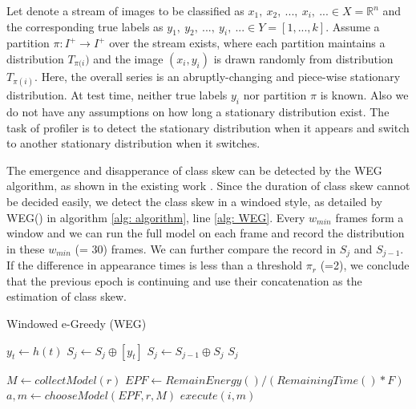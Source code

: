 \documentclass[pageno]{jpaper}
\begin{document}
Let denote a stream of images to be classified as $x_1, \: x_2, \: ...,\: x_i, \: ... \in X = \mathbb{R}^n$ and the corresponding true labels as $y_1, \:y_2, \:...,\:y_i, \:... \in Y = [1, ..., k]$. Assume a partition $\pi: I^+ \rightarrow I^+$ over the stream exists, where each partition maintains a distribution $T_{\pi(i})$ and the image $(x_i, y_i)$ is drawn randomly from distribution $T_{\pi(i)}$. Here, the overall series is an abruptly-changing and piece-wise stationary distribution. At test time, neither true labels $y_i$ nor partition $\pi$ is known. Also we do not have any assumptions on how long a stationary distribution exist. The task of profiler is to detect the stationary distribution when it appears and switch to another stationary distribution when it switches.

The emergence and disapperance of class skew can be detected by the WEG algorithm, as shown in the existing work \cite{shen2016fast}. Since the duration of class skew cannot be decided easily, we detect the class skew in a windoed style, as detailed by WEG() in algorithm \ref{alg: algorithm}, line \ref{alg: WEG}. Every $w_{min}$ frames form a window and we can run the full model on each frame and record the distribution in these $w_{min}$ (= 30) frames. We can further compare the record in $S_j$ and $S_{j-1}$. If the difference in appearance times is less than a threshold $\pi_r$ (=2), we conclude that the previous epoch is continuing and use their concatenation as the estimation of class skew. 



\begin{algorithm} 
 \small
 \caption{Windowed e-Greedy (WEG)}
  \begin{algorithmic}[1]
     \label{alg: WEG}
            \State $y_t \leftarrow h(t)$
            \State $S_j \leftarrow S_j \oplus [y_t]$
        \EndFor
            \State $S_j \leftarrow S_{j-1} \oplus S_j$
        \EndIf
        \State \Return $S_j$
    \EndFunction
  
       \label{alg: scheduler}
        \State $M \leftarrow collectModel(r)$
        \State $EPF \leftarrow RemainEnergy() / (RemainingTime() \ast F) $
        \State $a, m \leftarrow chooseModel(EPF, r, M)$  
        \State $execute(i,m)$        
    \EndFunction
\end{algorithmic}
 \label{alg: algorithm}

\end{algorithm}
\end{document}
